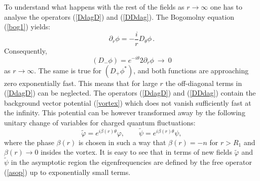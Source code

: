 \documentclass[a4paper,12pt]{article}
\begin{document}
To understand what happens with the rest of the fields as $r\to\infty$
one has to analyse the operators (\ref{DdagD}) and (\ref{DDdag}).
The Bogomolny equation (\ref{bog1}) yields:
\begin{equation}
\partial_r \phi =-\frac ir D_\theta \phi \,.
\end{equation}
Consequently,
\begin{equation}
(D_-\phi )= e^{-i\theta} 2 \partial_r \phi \ {\to}\ 0
\end{equation}
as $r\to \infty$. The same is true for $(D_+\phi^*)$, and both
functions are approaching zero exponentially fast. This means that
for large $r$ the off-diagonal terms in (\ref{DdagD}) can be
neglected. The operators (\ref{DdagD}) and (\ref{DDdag}) contain
the background vector potential (\ref{vortex}) which does not
vanish sufficiently fast at the infinity. This potential can be
however transformed away by the following unitary change of 
variables for charged quantum fluctuations:
\begin{equation}
\tilde \varphi =e^{i\beta(r) \theta} \varphi,\qquad
\tilde \psi =e^{i\beta(r) \theta} \psi,\label{tilfiel}
\end{equation}
where the phase $\beta (r)$ is chosen in such a way that
$\beta (r)=-n$ for $r>R_1$ and $\beta (r)\to 0$ insides the vortex.
It is easy to see that in terms of new fields $\tilde\varphi$ and
$\tilde\psi$ in the asymptotic region the eigenfrequencies are
defined by the free operator (\ref{asop}) up to exponentially
small terms. 
\end{document}
